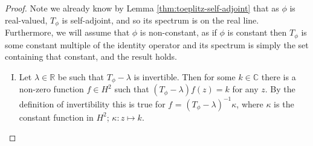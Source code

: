 \documentclass[../main.tex]{subfiles}
\begin{document}
\begin{proof}
Note we already know by Lemma \ref{thm:toeplitz-self-adjoint} that as $\phi$ is real-valued, $T_\phi$ is self-adjoint, and so its spectrum is on the real line. 
Furthermore, we will assume that $\phi$ is non-constant, as if $\phi$ is constant then $T_\phi$ is some constant multiple of the identity operator
and its spectrum is simply the set containing that constant, and the result holds.
\begin{enumerate}[I.]
\item Let $\lambda \in \mathbb{R}$ be such that $T_\phi - \lambda$ is invertible. Then for some $k \in \mathbb{C}$ there is a non-zero function $f \in H^2$ such that $(T_\phi - \lambda)f(z) = k$ for any $z$. By the definition of invertibility this is true for $f$ = $(T_\phi - \lambda)^{-1}\kappa$, where
$\kappa$ is the constant function in $H^2$; $\kappa : z \mapsto k$.


\end{enumerate}
\end{proof}
\end{document}
